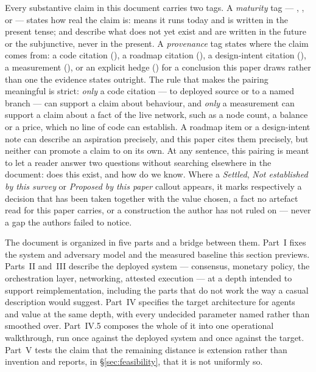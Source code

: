 Every substantive claim in this document carries two tags. A \emph{maturity} tag — \shipped,
\inprogress, \planned or \vision — states how real the claim is: \shipped means it runs today and is
written in the present tense; \planned and \vision describe what does not yet exist and are written
in the future or the subjunctive, never in the present. A \emph{provenance} tag states where the claim
comes from: a code citation (), a roadmap citation
(), a design-intent citation (), a measurement
(), or an explicit hedge (\srcinferred) for a conclusion this paper draws
rather than one the evidence states outright. The rule that makes the pairing meaningful is strict:
\emph{only} a code citation --- to deployed source or to a named branch --- can support a \shipped
claim about behaviour, and \emph{only} a measurement can support a \shipped claim about a fact of the
live network, such as a node count, a balance or a price, which no line of code can establish. A
roadmap item or a design-intent note can
describe an aspiration precisely, and this paper cites them precisely, but neither can promote a claim
to \shipped on its own. At any sentence, this pairing is meant to let a reader answer two questions
without searching elsewhere in the document: does this exist, and how do we know. Where a
\emph{Settled}, \emph{Not established by this survey} or \emph{Proposed by this paper} callout
appears, it marks respectively a decision that has been taken together with the value chosen, a fact
no artefact read for this paper carries, or a construction the author has not ruled on — never a gap
the authors failed to notice.

The document is organized in five parts and a bridge between them. Part~I fixes the system and
adversary model and the measured baseline this section previews. Parts~II and~III describe the
deployed system — consensus, monetary policy, the orchestration layer, networking, attested
execution — at a depth intended to support reimplementation, including the parts that do not work the
way a casual description would suggest. Part~IV specifies the target architecture for agents and
value at the same depth, with every undecided parameter named rather than smoothed over. Part~IV.5
composes the whole of it into one operational walkthrough, run once against the deployed system and
once against the target. Part~V tests the claim that the remaining distance is extension rather than
invention and reports, in \S\ref{sec:feasibility}, that it is not uniformly so.

